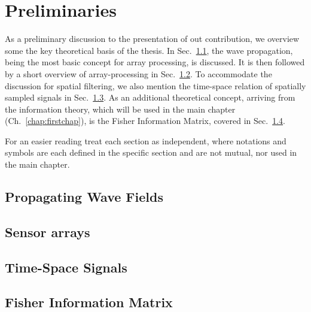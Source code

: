 \chapter{Preliminaries}
\label{chap:prelims}

As a preliminary discussion to the presentation of out contribution, we overview some the key theoretical basis of the thesis.
In Sec.~\ref{sec:prlm_propWaveField}, the wave propagation, being the most basic concept for array processing, is discussed.
It is then followed by a short overview of array-processing in Sec.~\ref{sec:prlm_sensorArrays}.
To accommodate the discussion for spatial filtering, we also mention the time-space relation of spatially sampled signals in Sec.~\ref{sec:prlm_timeSpaceSig}.
As an additional theoretical concept, arriving from the information theory, which will be used in the main chapter (Ch.~\ref{chap:firstchap}), is the Fisher Information Matrix, covered in Sec.~\ref{sec:prlm_FIM}.
\par 
For an easier reading treat each section as independent, where notations and symbols are each defined in the specific section and are not mutual, nor used in the main chapter. 


\section{Propagating Wave Fields}
\label{sec:prlm_propWaveField}

% 
\section{Sensor arrays}
\label{sec:prlm_sensorArrays}

\section{Time-Space Signals}
\label{sec:prlm_timeSpaceSig}

% 
\section{Fisher Information Matrix}
\label{sec:prlm_FIM}
